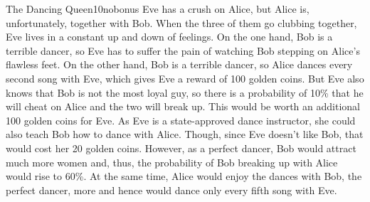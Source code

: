 \documentclass[twoside,english,colorbacktitle,accentcolor=tud9c,10pt]{tudexercise}
\begin{document}
\begin{questions}
\begin{question}{The Dancing Queen}{10}{nobonus}
	Eve has a crush on Alice, but Alice is, unfortunately, together with Bob.
	When the three of them go clubbing together, Eve lives in a constant up and down of feelings.
	On the one hand, Bob is a terrible dancer, so Eve has to suffer the pain of watching Bob stepping on Alice's flawless feet. 
	On the other hand, Bob is a terrible dancer, so Alice dances every second song with Eve, which gives Eve a reward of 100 golden coins.
	But Eve also knows that Bob is not the most loyal guy, so there is a probability of 10\% that he will cheat on Alice and the two will break up.
	This would be worth an additional 100 golden coins for Eve.
	As Eve is a state-approved dance instructor, she could also teach Bob how to dance with Alice.
	Though, since Eve doesn't like Bob, that would cost her 20 golden coins.
	However, as a perfect dancer, Bob would attract much more women and, thus, the probability of Bob breaking up with Alice would rise to 60\%.
	At the same time, Alice would enjoy the dances with Bob, the perfect dancer, more and hence would dance only every fifth song with Eve.


\end{question}
\end{questions}
\end{document}
